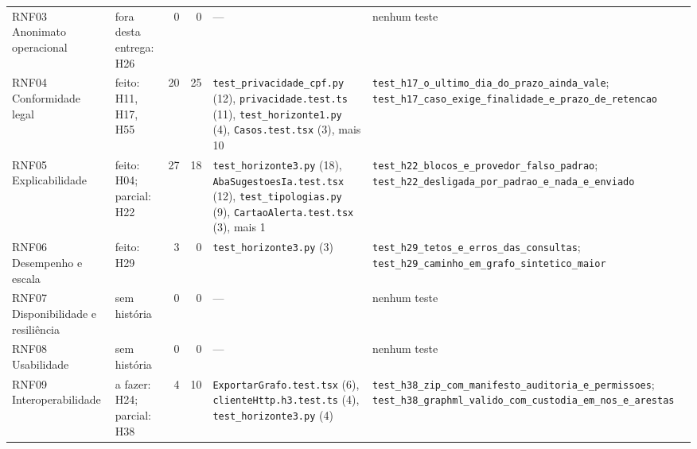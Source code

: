 \begin{scriptsize}
\begin{longtable}{>{\raggedright\arraybackslash}p{2.5cm}>{\raggedright\arraybackslash}p{1.9cm}rr>{\raggedright\arraybackslash}p{3.3cm}>{\raggedright\arraybackslash}p{4.5cm}}
RNF03 Anonimato operacional & fora desta entrega: H26 & 0 & 0 & --- & nenhum teste \\
RNF04 Conformidade legal & feito: H11, H17, H55 & 20 & 25 & \texttt{test\_\allowbreak{}privacidade\_\allowbreak{}cpf.\allowbreak{}py} (12), \texttt{privacidade.\allowbreak{}test.\allowbreak{}ts} (11), \texttt{test\_\allowbreak{}horizonte1.\allowbreak{}py} (4), \texttt{Casos.\allowbreak{}test.\allowbreak{}tsx} (3), mais 10 & \texttt{test\_\allowbreak{}h17\_\allowbreak{}o\_\allowbreak{}ultimo\_\allowbreak{}dia\_\allowbreak{}do\_\allowbreak{}prazo\_\allowbreak{}ainda\_\allowbreak{}vale}; \texttt{test\_\allowbreak{}h17\_\allowbreak{}caso\_\allowbreak{}exige\_\allowbreak{}finalidade\_\allowbreak{}e\_\allowbreak{}prazo\_\allowbreak{}de\_\allowbreak{}retencao} \\
RNF05 Explicabilidade & feito: H04; parcial: H22 & 27 & 18 & \texttt{test\_\allowbreak{}horizonte3.\allowbreak{}py} (18), \texttt{AbaSugestoesIa.\allowbreak{}test.\allowbreak{}tsx} (12), \texttt{test\_\allowbreak{}tipologias.\allowbreak{}py} (9), \texttt{CartaoAlerta.\allowbreak{}test.\allowbreak{}tsx} (3), mais 1 & \texttt{test\_\allowbreak{}h22\_\allowbreak{}blocos\_\allowbreak{}e\_\allowbreak{}provedor\_\allowbreak{}falso\_\allowbreak{}padrao}; \texttt{test\_\allowbreak{}h22\_\allowbreak{}desligada\_\allowbreak{}por\_\allowbreak{}padrao\_\allowbreak{}e\_\allowbreak{}nada\_\allowbreak{}e\_\allowbreak{}enviado} \\
RNF06 Desempenho e escala & feito: H29 & 3 & 0 & \texttt{test\_\allowbreak{}horizonte3.\allowbreak{}py} (3) & \texttt{test\_\allowbreak{}h29\_\allowbreak{}tetos\_\allowbreak{}e\_\allowbreak{}erros\_\allowbreak{}das\_\allowbreak{}consultas}; \texttt{test\_\allowbreak{}h29\_\allowbreak{}caminho\_\allowbreak{}em\_\allowbreak{}grafo\_\allowbreak{}sintetico\_\allowbreak{}maior} \\
RNF07 Disponibilidade e resiliência & sem história & 0 & 0 & --- & nenhum teste \\
RNF08 Usabilidade & sem história & 0 & 0 & --- & nenhum teste \\
RNF09 Interoperabilidade & a fazer: H24; parcial: H38 & 4 & 10 & \texttt{ExportarGrafo.\allowbreak{}test.\allowbreak{}tsx} (6), \texttt{clienteHttp.\allowbreak{}h3.\allowbreak{}test.\allowbreak{}ts} (4), \texttt{test\_\allowbreak{}horizonte3.\allowbreak{}py} (4) & \texttt{test\_\allowbreak{}h38\_\allowbreak{}zip\_\allowbreak{}com\_\allowbreak{}manifesto\_\allowbreak{}auditoria\_\allowbreak{}e\_\allowbreak{}permissoes}; \texttt{test\_\allowbreak{}h38\_\allowbreak{}graphml\_\allowbreak{}valido\_\allowbreak{}com\_\allowbreak{}custodia\_\allowbreak{}em\_\allowbreak{}nos\_\allowbreak{}e\_\allowbreak{}arestas} \\

\end{longtable}
\end{scriptsize}
